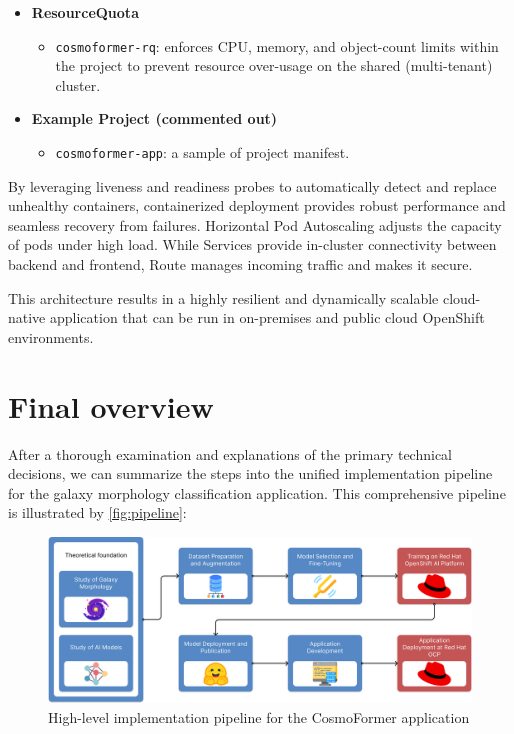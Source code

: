 \begin{itemize}
  \item \textbf{ResourceQuota}
    \begin{itemize}
      \item \texttt{cosmoformer-rq}: enforces CPU, memory, and object-count limits within the project to prevent resource over-usage on the shared (multi-tenant) cluster.
    \end{itemize}

  \item \textbf{Example Project (commented out)}
    \begin{itemize}
      \item \texttt{cosmoformer-app}: a sample of project manifest.
    \end{itemize}
\end{itemize}

By leveraging liveness and readiness probes to automatically detect and replace unhealthy containers, containerized deployment provides robust performance and seamless recovery from failures. Horizontal Pod Autoscaling adjusts the capacity of pods under high load. While Services provide in-cluster connectivity between backend and frontend, Route manages incoming traffic and makes it secure.

This architecture results in a highly resilient and dynamically scalable cloud-native application that can be run in on-premises and public cloud OpenShift environments.

\section*{Final overview}

After a thorough examination and explanations of the primary technical decisions, we can summarize the steps into the unified implementation pipeline for the galaxy morphology classification application. This comprehensive pipeline is illustrated by \autoref{fig:pipeline}:

\begin{figure}[htbp]
  \centering
  \includegraphics[width=\textwidth]{obrazky-figures/04-draft/pipeline.png}
  \caption{High-level implementation pipeline for the CosmoFormer application}
  \label{fig:pipeline}
\end{figure}

